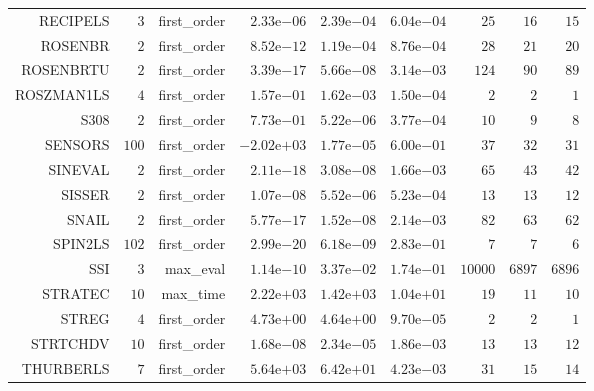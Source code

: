 \begin{longtable}{rrrrrrrrr}
RECIPELS & \(     3\) & first\_order & \( 2.33\)e\(-06\) & \( 2.39\)e\(-04\) & \( 6.04\)e\(-04\) & \(    25\) & \(    16\) & \(    15\) \\
ROSENBR & \(     2\) & first\_order & \( 8.52\)e\(-12\) & \( 1.19\)e\(-04\) & \( 8.76\)e\(-04\) & \(    28\) & \(    21\) & \(    20\) \\
ROSENBRTU & \(     2\) & first\_order & \( 3.39\)e\(-17\) & \( 5.66\)e\(-08\) & \( 3.14\)e\(-03\) & \(   124\) & \(    90\) & \(    89\) \\
ROSZMAN1LS & \(     4\) & first\_order & \( 1.57\)e\(-01\) & \( 1.62\)e\(-03\) & \( 1.50\)e\(-04\) & \(     2\) & \(     2\) & \(     1\) \\
S308 & \(     2\) & first\_order & \( 7.73\)e\(-01\) & \( 5.22\)e\(-06\) & \( 3.77\)e\(-04\) & \(    10\) & \(     9\) & \(     8\) \\
SENSORS & \(   100\) & first\_order & \(-2.02\)e\(+03\) & \( 1.77\)e\(-05\) & \( 6.00\)e\(-01\) & \(    37\) & \(    32\) & \(    31\) \\
SINEVAL & \(     2\) & first\_order & \( 2.11\)e\(-18\) & \( 3.08\)e\(-08\) & \( 1.66\)e\(-03\) & \(    65\) & \(    43\) & \(    42\) \\
SISSER & \(     2\) & first\_order & \( 1.07\)e\(-08\) & \( 5.52\)e\(-06\) & \( 5.23\)e\(-04\) & \(    13\) & \(    13\) & \(    12\) \\
SNAIL & \(     2\) & first\_order & \( 5.77\)e\(-17\) & \( 1.52\)e\(-08\) & \( 2.14\)e\(-03\) & \(    82\) & \(    63\) & \(    62\) \\
SPIN2LS & \(   102\) & first\_order & \( 2.99\)e\(-20\) & \( 6.18\)e\(-09\) & \( 2.83\)e\(-01\) & \(     7\) & \(     7\) & \(     6\) \\
SSI & \(     3\) & max\_eval & \( 1.14\)e\(-10\) & \( 3.37\)e\(-02\) & \( 1.74\)e\(-01\) & \( 10000\) & \(  6897\) & \(  6896\) \\
STRATEC & \(    10\) & max\_time & \( 2.22\)e\(+03\) & \( 1.42\)e\(+03\) & \( 1.04\)e\(+01\) & \(    19\) & \(    11\) & \(    10\) \\
STREG & \(     4\) & first\_order & \( 4.73\)e\(+00\) & \( 4.64\)e\(+00\) & \( 9.70\)e\(-05\) & \(     2\) & \(     2\) & \(     1\) \\
STRTCHDV & \(    10\) & first\_order & \( 1.68\)e\(-08\) & \( 2.34\)e\(-05\) & \( 1.86\)e\(-03\) & \(    13\) & \(    13\) & \(    12\) \\
THURBERLS & \(     7\) & first\_order & \( 5.64\)e\(+03\) & \( 6.42\)e\(+01\) & \( 4.23\)e\(-03\) & \(    31\) & \(    15\) & \(    14\) \\

\end{longtable}
